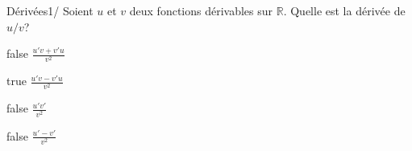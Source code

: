         	\begin{question}{24}{Dérivées}{1}{/}
				Soient $u$ et $v$ deux fonctions dérivables sur $\mathbb{R}$. Quelle est la dérivée de $u/v$?
            \end{question}
            \begin{reponses}
            	\item[false] $\frac{u'v+v'u}{v^2}$
            	\item[true] $\frac{u'v-v'u}{v^2}$
                \item[false] $\frac{u'v'}{v^2}$
                \item[false] $\frac{u'-v'}{v^2}$
            \end{reponses}
